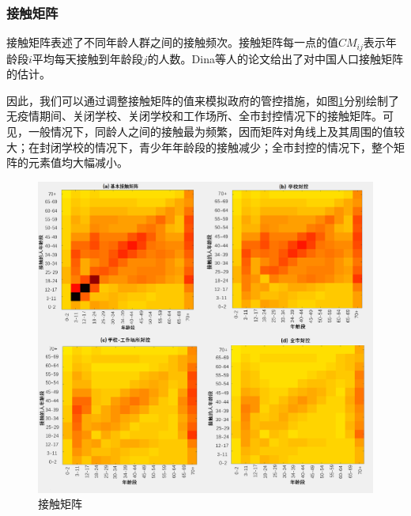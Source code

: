 \documentclass[bwprint]{gmcmthesis}
\numberwithin{figure}{section}
\begin{document}
\subsubsection{接触矩阵}
接触矩阵表述了不同年龄人群之间的接触频次。接触矩阵每一点的值$CM_{ij}$表示年龄段$i$平均每天接触到年龄段$j$的人数。Dina等人的论文\cite{}给出了对中国人口接触矩阵的估计。

\par 因此，我们可以通过调整接触矩阵的值来模拟政府的管控措施，如图\ref{cm}分别绘制了无疫情期间、关闭学校、关闭学校和工作场所、全市封控情况下的接触矩阵。可见，一般情况下，同龄人之间的接触最为频繁，因而矩阵对角线上及其周围的值较大；在封闭学校的情况下，青少年年龄段的接触减少；全市封控的情况下，整个矩阵的元素值均大幅减小。

\begin{figure}[!h]
\centering
\includegraphics[width=1\textwidth]{4CM.png}
\caption{接触矩阵}
\label{cm}
\end{figure}
%
%
%
\end{document}
